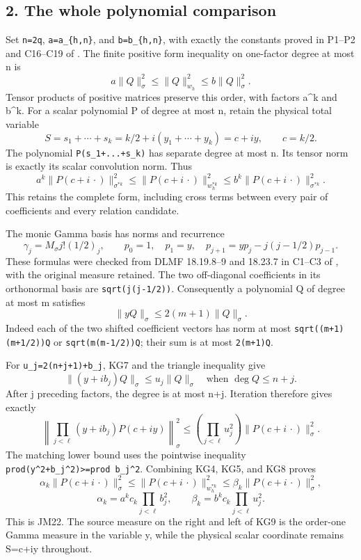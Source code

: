 \subsection{2. The whole polynomial comparison}\label{mrkg:the-whole-polynomial-comparison}

Set \texttt{n=2q}, \texttt{a=a\_\{h,n\}}, and \texttt{b=b\_\{h,n\}}, with exactly the constants proved in P1--P2 and C16--C19 of . The finite positive form inequality on one-factor degree at most n is \[
a\|Q\|_\sigma^2\le\|Q\|_{w_h}^2\le b\|Q\|_\sigma^2.
\] Tensor products of positive matrices preserve this order, with factors a\^{}k and b\^{}k. For a scalar polynomial P of degree at most n, retain the physical total variable \[
S=s_1+\cdots+s_k=k/2+i(y_1+\cdots+y_k)=c+iy,
\qquad c=k/2.
\] The polynomial \texttt{P(s\_1+...+s\_k)} has separate degree at most n. Its tensor norm is exactly its scalar convolution norm. Thus \[
a^k\|P(c+i\,\cdot)\|_{\sigma^{*k}}^2
\le\|P(c+i\,\cdot)\|_{w_h^{*k}}^2
\le b^k\|P(c+i\,\cdot)\|_{\sigma^{*k}}^2.
\tag{KG5}
\] This retains the complete form, including cross terms between every pair of coefficients and every relation candidate.

The monic Gamma basis has norms and recurrence \[
\gamma_j=M_\sigma j!(1/2)_j,\qquad
p_0=1,\quad p_1=y,\quad
p_{j+1}=yp_j-j(j-1/2)p_{j-1}.
\tag{KG6}
\] These formulas were checked from DLMF 18.19.8--9 and 18.23.7 in C1--C3 of , with the original measure retained. The two off-diagonal coefficients in its orthonormal basis are \texttt{sqrt(j(j-1/2))}. Consequently a polynomial Q of degree at most m satisfies \[
\|yQ\|_\sigma\le2(m+1)\|Q\|_\sigma.
\tag{KG7}
\] Indeed each of the two shifted coefficient vectors has norm at most \texttt{sqrt((m+1)(m+1/2))\textbar{}\textbar{}Q\textbar{}\textbar{}} or \texttt{sqrt(m(m-1/2))\textbar{}\textbar{}Q\textbar{}\textbar{}}; their sum is at most \texttt{2(m+1)\textbar{}\textbar{}Q\textbar{}\textbar{}}.

For \texttt{u\_j=2(n+j+1)+b\_j}, KG7 and the triangle inequality give \[
\|(y+ib_j)Q\|_\sigma\le u_j\|Q\|_\sigma
\quad\text{when }\deg Q\le n+j.
\] After j preceding factors, the degree is at most n+j. Iteration therefore gives exactly \[
\left\|\prod_{j<\ell}(y+ib_j)P(c+iy)\right\|_\sigma^2
\le\left(\prod_{j<\ell}u_j^2\right)
\|P(c+i\,\cdot)\|_\sigma^2.
\tag{KG8}
\] The matching lower bound uses the pointwise inequality \texttt{prod(y\^{}2+b\_j\^{}2)\textgreater{}=prod\ b\_j\^{}2}. Combining KG4, KG5, and KG8 proves \[
\boxed{\alpha_k\|P(c+i\,\cdot)\|_\sigma^2
\le\|P(c+i\,\cdot)\|_{w_h^{*k}}^2
\le\beta_k\|P(c+i\,\cdot)\|_\sigma^2,}
\tag{KG9}
\] \[
\alpha_k=a^kc_k\prod_{j<\ell}b_j^2,\qquad
\beta_k=b^kc_k\prod_{j<\ell}u_j^2.
\] This is JM22. The source measure on the right and left of KG9 is the order-one Gamma measure in the variable y, while the physical scalar coordinate remains S=c+iy throughout.

